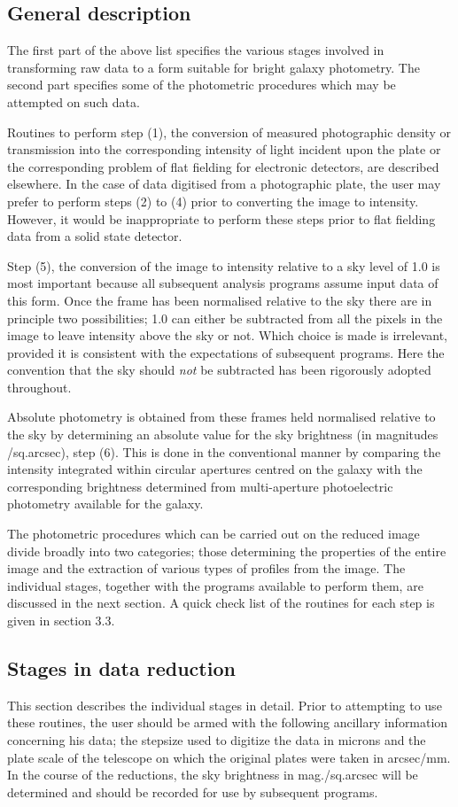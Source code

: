 \subsection {General description}
The first part of the above list specifies the various stages involved in
transforming raw data to a form suitable for bright galaxy photometry.
The second part specifies some of the photometric procedures which may be
attempted on such data.

Routines to perform step (1), the conversion of measured photographic density or
transmission into the corresponding intensity of light incident upon the plate
or the corresponding problem of flat fielding for electronic detectors, are
described elsewhere.
In the case of data digitised from a photographic plate, the user may prefer to
perform steps (2) to (4) prior to converting the image to intensity.
However, it would be inappropriate to perform these steps prior to flat fielding
data from a solid state detector.

Step (5), the conversion of the image to intensity relative to a sky level of
1.0 is most important because all subsequent analysis programs assume input data
of this form.
Once the frame has been normalised relative to the sky there are in principle
two possibilities; 1.0 can either be subtracted from all the pixels in the image
to leave intensity above the sky or not.
Which choice is made is irrelevant, provided it is consistent with the
expectations of subsequent programs.
Here the convention that the sky should {\em not} be subtracted has been
rigorously adopted throughout.

Absolute photometry is obtained from these frames held normalised relative to
the sky by determining an absolute value for the sky brightness (in magnitudes
/sq.arcsec), step (6).
This is done in the conventional manner by comparing the intensity integrated
within circular apertures centred on the galaxy with the corresponding
brightness determined from multi-aperture photoelectric photometry available for
the galaxy.

The photometric procedures which can be carried out on the reduced image divide
broadly into two categories; those determining the properties of the entire
image and the extraction of various types of profiles from the image.
The individual stages, together with the programs available to perform them,
are discussed in the next section.
A quick check list of the routines for each step is given in section 3.3.
\subsection {Stages in data reduction}
This section describes the individual stages in detail.
Prior to attempting to use these routines, the user should be armed with the
following ancillary information concerning his data; the stepsize used to
digitize the data in microns and the plate scale of the telescope on which the
original plates were taken in arcsec/mm.
In the course of the reductions, the sky brightness in mag./sq.arcsec will be
determined and should be recorded for use by subsequent programs.


